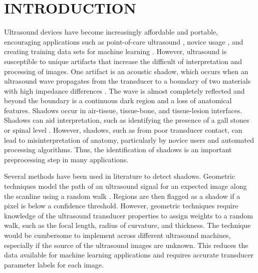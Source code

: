 \documentclass[preprint,5p,authoryear]{elsarticle}
\begin{document}




\section*{INTRODUCTION}
\label{intro}
Ultrasound devices have become increasingly affordable and portable, encouraging applications such as point-of-care ultrasound \citep{Bouhemad2011}, novice usage \citep{Becker2016}, and creating training data sets for machine learning \citep{Ghose2013}. However, ultrasound is susceptible to unique artifacts that increase the difficult of interpretation and processing of images. One artifact is an acoustic shadow, which occurs when an ultrasound wave propagates from the transducer to a boundary of two materials with high impedance differences \citep{Kremkau1986}. The wave is almost completely reflected and beyond the boundary is a continuous dark region and a loss of anatomical features. Shadows occur in air-tissue, tissue-bone, and tissue-lesion interfaces. Shadows can aid interpretation, such as identifying the presence of a gall stones \citep{Good1979} or spinal level \citep{Galiano2005}. However, shadows, such as from poor transducer contact, can lead to misinterpretation of anatomy, particularly by novice users and automated processing algorithms. Thus, the identification of shadows is an important preprocessing step in many applications.

Several methods have been used in literature to detect shadows. Geometric techniques model the path of an ultrasound signal for an expected image along the scanline using a random walk \citep{Karamalis2012}. Regions are then flagged as a shadow if a pixel is below a confidence threshold. However, geometric techniques require knowledge of the ultrasound transducer properties to assign weights to a random walk, such as the focal length, radius of curvature, and thickness. The technique would be cumbersome to implement across different ultrasound machines, especially if the source of the ultrasound images are unknown. This reduces the data available for machine learning applications and requires accurate transducer parameter labels for each image.
\end{document}
